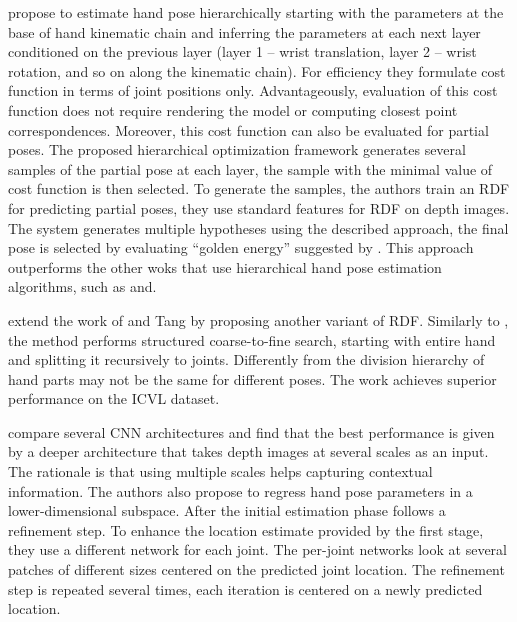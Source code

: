 \hspace{-0.4em}
\textbf{\cite{tang2015opening}} 
propose to estimate hand pose hierarchically starting with the parameters at the base of hand kinematic chain and inferring the parameters at each next layer conditioned on the previous layer (layer 1 – wrist translation, layer 2 – wrist rotation, and so on along the kinematic chain). For efficiency they formulate cost function in terms of joint positions only. Advantageously, evaluation of this cost function does not require rendering the model or computing closest point correspondences. Moreover, this cost function can also be evaluated for partial poses. The proposed hierarchical optimization framework generates several samples of the partial pose at each layer, the sample with the minimal value of cost function is then selected. To generate the samples, the authors train an RDF for predicting partial poses, they use standard features for RDF on depth images. The system generates multiple hypotheses using the described approach, the final pose is selected by evaluating “golden energy” suggested by \cite{sharp2015accurate}. This approach outperforms the other woks that use hierarchical hand pose estimation algorithms, such as \cite{tang_cvpr14} and\cite{sun2015cascaded}.

\hspace{-0.4em}
\textbf{\cite{li20153d}} 
extend the work of \cite{keskin2012hand} and Tang by proposing another variant of RDF. Similarly to \cite{tang_cvpr14}, the method performs structured coarse-to-fine search, starting with entire hand and splitting it recursively to joints. Differently from  \cite{tang_cvpr14} the division hierarchy of hand parts may not be the same for different poses. The work achieves superior performance on the ICVL dataset.

\hspace{-0.4em}
\textbf{\cite{oberweger2015hands}} 
compare several CNN architectures and find that the best performance is given by a deeper architecture that takes depth images at several scales as an input. The rationale is that using multiple scales helps capturing contextual information. The authors also propose to regress hand pose parameters in a lower-dimensional subspace. After the initial estimation phase follows a refinement step. To enhance the location estimate provided by the first stage, they use a different network for each joint. The per-joint networks look at several patches of different sizes centered on the predicted joint location. The refinement step is repeated several times, each iteration is centered on a newly predicted location.

